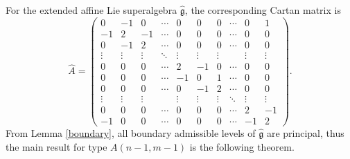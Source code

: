 \documentclass[12pt]{article}
\begin{document}
For the extended affine Lie superalgebra $\widehat{\mathfrak{g}}$,
the corresponding Cartan matrix is
$$\widehat{A}=\begin{pmatrix}
0&-1 & 0  & \cdots & 0 & 0 & 0 & \cdots & 0 & 1\\
-1&2 & -1  & \cdots & 0 & 0 & 0 & \cdots & 0 & 0\\
0&-1 & 2  & \cdots & 0 & 0 & 0 & \cdots & 0 & 0\\
\vdots &\vdots & \vdots & \ddots & \vdots & \vdots & \vdots & & \vdots & \vdots\\
0&0 & 0 & \cdots & 2 & -1 & 0 & \cdots & 0 & 0\\
0&0 & 0  & \cdots & -1 & 0 & 1 & \cdots & 0 & 0\\
0&0 & 0 & \cdots & 0 & -1 & 2 & \cdots & 0 & 0\\
\vdots & \vdots & \vdots & &\vdots & \vdots & \vdots& \ddots& \vdots & \vdots \\
0&0 & 0  & \cdots & 0 & 0 & 0 & \cdots&2 & -1\\
-1&0 & 0  & \cdots & 0 & 0 & 0 & \cdots&-1 & 2
\end{pmatrix}
.$$
From Lemma \ref{boundary}, all boundary admissible levels of $\widehat{\mathfrak{g}}$ are principal,
thus the main result for type $A(n-1,m-1)$ is the following theorem.
\end{document}
